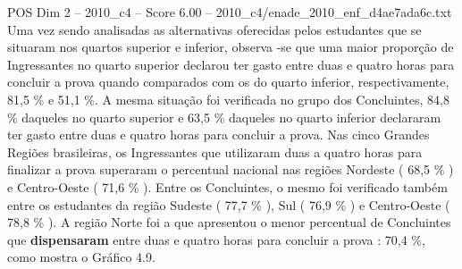 \begin{textsample}{POS Dim 2 – 2010\_c4 – Score 6.00 – 2010\_c4/enade\_2010\_enf\_d4ae7ada6c.txt}
Uma vez sendo analisadas as alternativas oferecidas pelos estudantes que se situaram nos quartos superior e inferior, observa -se que uma maior proporção de Ingressantes no quarto superior declarou ter gasto entre duas e quatro horas para concluir a prova quando comparados com os do quarto inferior, respectivamente, 81,5 \% e 51,1 \%.
A mesma situação foi verificada no grupo dos Concluintes, 84,8 \% daqueles no quarto superior e 63,5 \% daqueles no quarto inferior declararam ter gasto entre duas e quatro horas para concluir a prova.
Nas cinco Grandes Regiões brasileiras, os Ingressantes que utilizaram duas a quatro horas para finalizar a prova superaram o percentual nacional nas regiões Nordeste ( 68,5 \% ) e Centro-Oeste ( 71,6 \% ).
Entre os Concluintes, o mesmo foi verificado também entre os estudantes da região Sudeste ( 77,7 \% ), Sul ( 76,9 \% ) e Centro-Oeste ( 78,8 \% ).
A região Norte foi a que apresentou o menor percentual de Concluintes que \textbf{dispensaram} entre duas e quatro horas para concluir a prova : 70,4 \%, como mostra o Gráfico 4.9.

\end{textsample}

